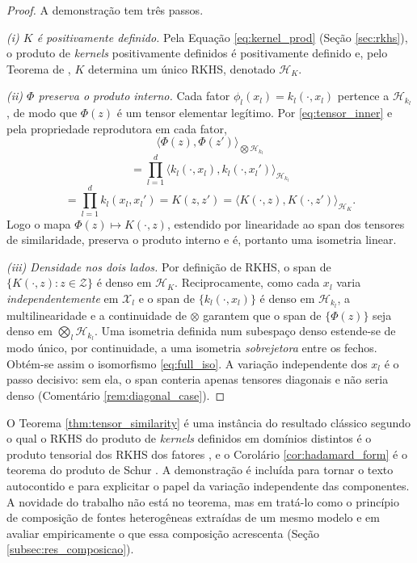 \begin{proof}
A demonstração tem três passos.
 
\noindent \textit{(i) $K$ é positivamente definido.} Pela Equação \eqref{eq:kernel_prod} (Seção \ref{sec:rkhs}), o produto de \textit{kernels} positivamente definidos é positivamente definido e, pelo Teorema de \cite{Aronszajn1950}, $K$ determina um único RKHS, denotado $\mathcal{H}_K$.
 
\noindent \textit{(ii) $\Phi$ preserva o produto interno.} Cada fator $\phi_l(x_l) = k_l(\cdot, x_l)$ pertence a $\mathcal{H}_{k_l}$, de modo que $\Phi(z)$ é um tensor elementar legítimo. Por \eqref{eq:tensor_inner} e pela propriedade reprodutora em cada fator,
\begin{equation*}
    \langle \Phi(z), \Phi(z') \rangle_{\bigotimes \mathcal{H}_{k_l}}
\end{equation*}
\begin{equation*}
    = \prod_{l=1}^{d} \langle k_l(\cdot, x_l), k_l(\cdot, x_l') \rangle_{\mathcal{H}_{k_l}}
\end{equation*}
\begin{equation*}
    = \prod_{l=1}^{d} k_l(x_l, x_l') = K(z, z') = \langle K(\cdot, z), K(\cdot, z') \rangle_{\mathcal{H}_K}.
\end{equation*}
Logo o mapa $\Phi(z) \mapsto K(\cdot, z)$, estendido por linearidade ao span dos tensores de similaridade, preserva o produto interno e é, portanto uma isometria linear.
 
\noindent \textit{(iii) Densidade nos dois lados.} Por definição de RKHS, o span de $\{K(\cdot, z) : z \in \mathcal{Z}\}$ é denso em $\mathcal{H}_K$. Reciprocamente, como cada $x_l$ varia \emph{independentemente} em $\mathcal{X}_l$ e o span de $\{k_l(\cdot, x_l)\}$ é denso em $\mathcal{H}_{k_l}$, a multilinearidade e a continuidade de $\otimes$ garantem que o span de $\{\Phi(z)\}$ seja denso em $\bigotimes_l \mathcal{H}_{k_l}$. Uma isometria definida num subespaço denso estende-se de modo único, por continuidade, a uma isometria \emph{sobrejetora} entre os fechos. Obtém-se assim o isomorfismo \eqref{eq:full_iso}. A variação independente dos $x_l$ é o passo decisivo: sem ela, o span conteria apenas tensores diagonais e não seria denso (Comentário \ref{rem:diagonal_case}).
\end{proof}
 
\begin{remark}\label{rem:classico}
O Teorema \ref{thm:tensor_similarity} é uma instância do resultado clássico segundo o qual o RKHS do produto de \textit{kernels} definidos em domínios distintos é o produto tensorial dos RKHS dos fatores \citep{Aronszajn1950, BerlinetThomas2004, PaulsenRaghupathi2016}, e o Corolário \ref{cor:hadamard_form} é o teorema do produto de Schur \citep{Schur1911, HornJohnson2013}. A demonstração é incluída para tornar o texto autocontido e para explicitar o papel da variação independente das componentes. A novidade do trabalho não está no teorema, mas em tratá-lo como o princípio de composição de fontes heterogêneas extraídas de um mesmo modelo e em avaliar empiricamente o que essa composição acrescenta (Seção \ref{subsec:res_composicao}).
\end{remark}

